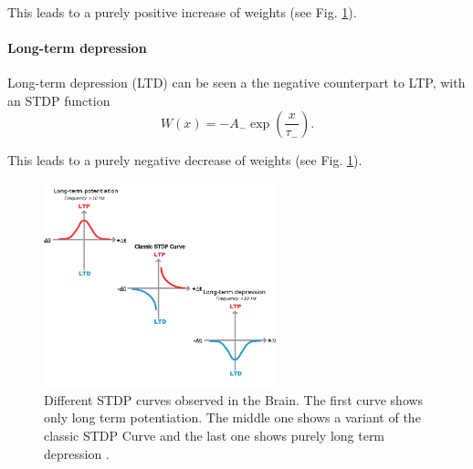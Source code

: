 This leads to a purely positive increase of weights (see Fig. \ref{fig:stdp}).

\paragraph{Long-term depression}

Long-term depression (LTD) can be seen a the negative counterpart to LTP, with an STDP function
\[
W(x) =  -A_- \exp(\frac{x}{\tau_-}).
\]

This leads to a purely negative decrease of weights (see Fig. \ref{fig:stdp}).

\begin{figure}
	\centering
    	\includegraphics[width=0.6\textwidth]{imgs/stdp_curves.jpg} 
    \caption{Different STDP curves observed in the Brain. The first curve shows only long term potentiation. The middle one shows a variant of the classic STDP Curve and the last one shows purely long term depression \cite{Buchanan2010}.}
	\label{fig:stdp}
\end{figure}